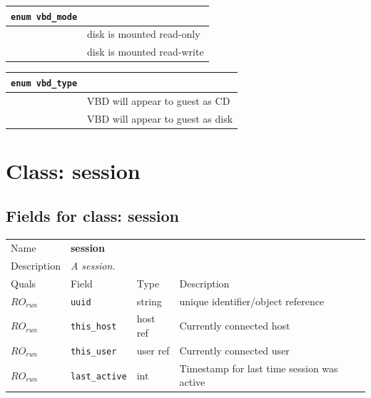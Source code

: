 \vspace{1cm}
\begin{longtable}{|ll|}
\hline
{\tt enum vbd\_mode} & \\
\hline
\hspace{0.5cm}{\tt RO} & disk is mounted read-only \\
\hspace{0.5cm}{\tt RW} & disk is mounted read-write \\
\hline
\end{longtable}

\vspace{1cm}
\begin{longtable}{|ll|}
\hline
{\tt enum vbd\_type} & \\
\hline
\hspace{0.5cm}{\tt CD} & VBD will appear to guest as CD \\
\hspace{0.5cm}{\tt Disk} & VBD will appear to guest as disk \\
\hline
\end{longtable}

\vspace{1cm}

\newpage
\section{Class: session}
\subsection{Fields for class: session}
\begin{longtable}{|lllp{}|}
\hline
\multicolumn{1}{|l}{Name} & \multicolumn{3}{l|}{\bf session} \\
\multicolumn{1}{|l}{Description} & \multicolumn{3}{l|}{\parbox{11cm}{\em A
session.}} \\
\hline
Quals & Field & Type & Description \\
\hline
$\mathit{RO}_\mathit{run}$ &  {\tt uuid} & string & unique identifier/object reference \\
$\mathit{RO}_\mathit{run}$ &  {\tt this\_host} & host ref & Currently connected host \\
$\mathit{RO}_\mathit{run}$ &  {\tt this\_user} & user ref & Currently connected user \\
$\mathit{RO}_\mathit{run}$ &  {\tt last\_active} & int & Timestamp for last time session was active \\
\hline
\end{longtable}
